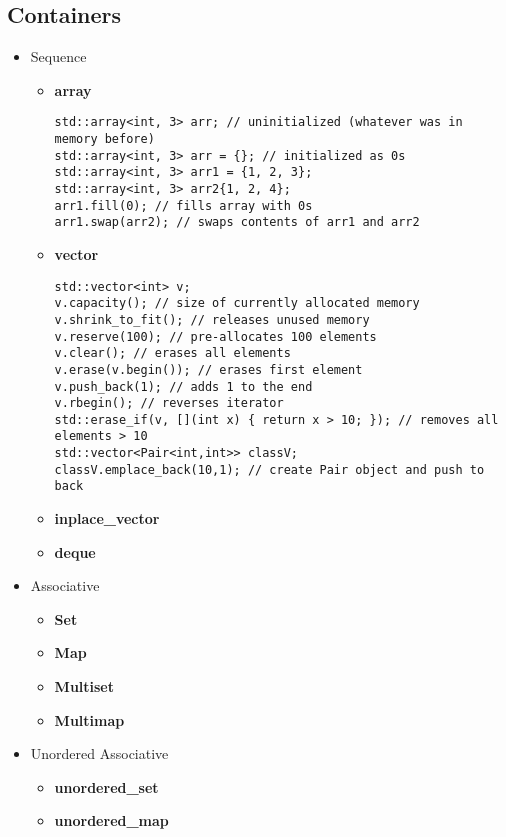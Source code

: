 \documentclass{article}
\begin{document}
    \subsection{Containers}
      \begin{itemize}
        \item Sequence
          \begin{itemize}
            \item \textbf{array}
              \begin{lstlisting}[style=cpp]
std::array<int, 3> arr; // uninitialized (whatever was in memory before)
std::array<int, 3> arr = {}; // initialized as 0s
std::array<int, 3> arr1 = {1, 2, 3};
std::array<int, 3> arr2{1, 2, 4};
arr1.fill(0); // fills array with 0s
arr1.swap(arr2); // swaps contents of arr1 and arr2
      \end{lstlisting}
            \item \textbf{vector}
              \begin{lstlisting}[style=cpp]
std::vector<int> v;
v.capacity(); // size of currently allocated memory
v.shrink_to_fit(); // releases unused memory
v.reserve(100); // pre-allocates 100 elements
v.clear(); // erases all elements
v.erase(v.begin()); // erases first element
v.push_back(1); // adds 1 to the end
v.rbegin(); // reverses iterator
std::erase_if(v, [](int x) { return x > 10; }); // removes all elements > 10
std::vector<Pair<int,int>> classV;
classV.emplace_back(10,1); // create Pair object and push to back
         \end{lstlisting}
            \item \textbf{inplace\_vector}
            \item \textbf{deque}
          \end{itemize}
        \item Associative
          \begin{itemize}
            \item \textbf{Set}
            \item \textbf{Map}
            \item \textbf{Multiset}
            \item \textbf{Multimap}
          \end{itemize}
        \item Unordered Associative
          \begin{itemize}
            \item \textbf{unordered\_set}
            \item \textbf{unordered\_map}

\end{itemize}
\end{itemize}
\end{document}
